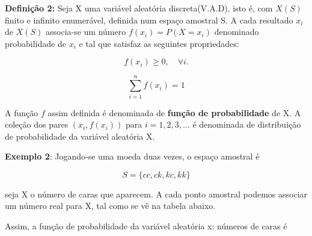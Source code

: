 \newpage
\textbf{Definição 2:} Seja X uma variável aleatória
discreta(V.A.D), isto é, com $X(S)$ finito e infinito enumerável,
definida num espaço amostral S. A cada resultado $x_{i}$ de $X(S)$
associa-se um número $f(x_{i})=P(X=x_{i})$ denominado
probabilidade de $x_{i}$ e tal que satisfaz as seguintes
propriedades:


$$
f(x_{i}) \geq 0, \quad \forall i.
$$

$$
\sum_{i=1}^{n}f(x_{i})=1
$$


A função $f$ assim definida é denominada de \textbf{função de
probabilidade} de X. A coleção dos pares $(x_{i}, f(x_{i}))$ para
$i=1,2,3,...$ é denominada de distribuição de probabilidade da
variável aleatória X.\vskip0.3cm

\textbf{Exemplo 2}: Jogando-se uma moeda duas vezes, o espaço
amostral é

$$
S= \{ cc, ck, kc, kk \}
$$

seja X o número de caras que aparecem. A cada ponto amostral
podemos associar um número real para X, tal como se vê na tabela
abaixo.




\begin{table}[!htb]
\end{table}



Assim, a função de probabilidade da variável aleatória x: números
de caras é

\begin{table}[!htb]
\end{table}


